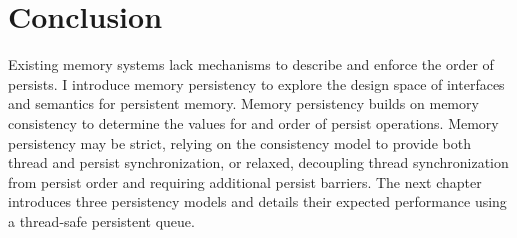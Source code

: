 %
%
\section{Conclusion}
\label{sec:Persistency:Conclusion}

Existing memory systems lack mechanisms to describe and enforce the order of persists.
I introduce memory persistency to explore the design space of interfaces and semantics for persistent memory.
Memory persistency builds on memory consistency to determine the values for and order of persist operations.
Memory persistency may be strict, relying on the consistency model to provide both thread and persist synchronization, or relaxed, decoupling thread synchronization from persist order and requiring additional persist barriers.
The next chapter introduces three persistency models and details their expected performance using a thread-safe persistent queue.
